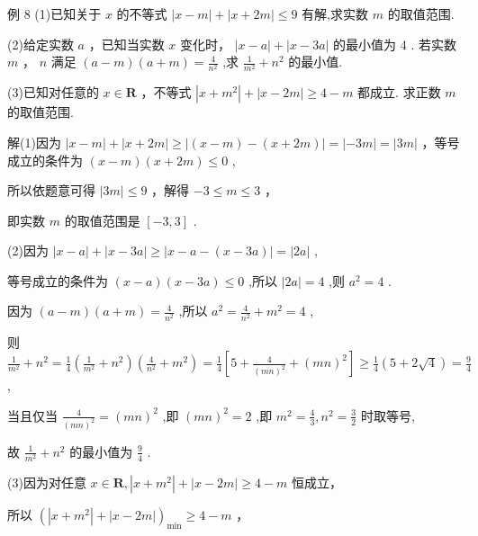 \documentclass[10pt]{article}
\begin{document}
例 8 (1)已知关于 \(x\) 的不等式 \(\left| {x - m}\right|  + \left| {x + {2m}}\right|  \leq  9\) 有解,求实数 \(m\) 的取值范围.

(2)给定实数 \(a\) ，已知当实数 \(x\) 变化时， \(\left| {x - a}\right|  + \left| {x - {3a}}\right|\) 的最小值为 4 . 若实数 \(m\) ， \(n\) 满足 \(\left( {a - m}\right) \left( {a + m}\right)  = \frac{4}{{n}^{2}}\) ,求 \(\frac{1}{{m}^{2}} + {n}^{2}\) 的最小值.

(3)已知对任意的 \(x \in  \mathbf{R}\) ，不等式 \(\left| {x + {m}^{2}}\right|  + \left| {x - {2m}}\right|  \geq  4 - m\) 都成立. 求正数 \(m\) 的取值范围.

解(1)因为 \(\left| {x - m}\right|  + \left| {x + {2m}}\right|  \geq  \left| {\left( {x - m}\right)  - \left( {x + {2m}}\right) }\right|  = \left| {-{3m}}\right|  = \left| {3m}\right|\) ，等号成立的条件为 \(\left( {x - m}\right) \left( {x + {2m}}\right)  \leq  0\) ,

所以依题意可得 \(\left| {3m}\right|  \leq  9\) ，解得 \(- 3 \leq  m \leq  3\) ，

即实数 \(m\) 的取值范围是 \(\left\lbrack  {-3,3}\right\rbrack\) .

(2)因为 \(\left| {x - a}\right|  + \left| {x - {3a}}\right|  \geq  \left| {x - a - \left( {x - {3a}}\right) }\right|  = \left| {2a}\right|\) ,

等号成立的条件为 \(\left( {x - a}\right) \left( {x - {3a}}\right)  \leq  0\) ,所以 \(\left| {2a}\right|  = 4\) ,则 \({a}^{2} = 4\) .

因为 \(\left( {a - m}\right) \left( {a + m}\right)  = \frac{4}{{n}^{2}}\) ,所以 \({a}^{2} = \frac{4}{{n}^{2}} + {m}^{2} = 4\) ,

则 \(\frac{1}{{m}^{2}} + {n}^{2} = \frac{1}{4}\left( {\frac{1}{{m}^{2}} + {n}^{2}}\right) \left( {\frac{4}{{n}^{2}} + {m}^{2}}\right)  = \frac{1}{4}\left\lbrack  {5 + \frac{4}{{\left( mn\right) }^{2}} + {\left( mn\right) }^{2}}\right\rbrack   \geq  \frac{1}{4}\left( {5 + 2\sqrt{4}}\right)  = \frac{9}{4}\) ,

当且仅当 \(\frac{4}{{\left( mn\right) }^{2}} = {\left( mn\right) }^{2}\) ,即 \({\left( mn\right) }^{2} = 2\) ,即 \({m}^{2} = \frac{4}{3},{n}^{2} = \frac{3}{2}\) 时取等号,

故 \(\frac{1}{{m}^{2}} + {n}^{2}\) 的最小值为 \(\frac{9}{4}\) .

(3)因为对任意 \(x \in  \mathbf{R},\left| {x + {m}^{2}}\right|  + \left| {x - {2m}}\right|  \geq  4 - m\) 恒成立，

所以 \({\left( \left| x + {m}^{2}\right|  + \left| x - {2m}\right| \right) }_{\min } \geq  4 - m\) ，
\end{document}
